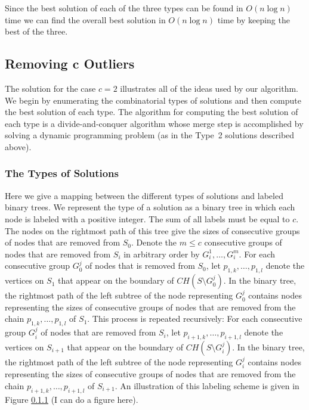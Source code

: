 \documentclass[lotsofwhite]{patmorin}
\begin{document}
Since the best solution of each of the three types can be found in
$O(n\log n)$ time we can find the overall best solution in $O(n\log
n)$ time by keeping the best of the three.

\subsection{Removing $\mathbf{c}$ Outliers}

The solution for the case $c=2$ illustrates all of the ideas used by
our algorithm.  We begin by enumerating the combinatorial types of
solutions and then compute the best solution of each type.  The
algorithm for computing the best solution of each type is a
divide-and-conquer algorithm whose merge step is accomplished by
solving a dynamic programming problem (as in the Type~2 solutions
described above).

\subsubsection{The Types of Solutions}

Here we give a mapping between the different types of solutions and labeled binary trees. We
represent the type of a solution as a binary tree in which each node is labeled with a
positive integer.  The sum of all labels must be equal to $c$.  The nodes on the rightmost
path of this tree give the sizes of consecutive groups of nodes that are removed from $S_0$.
Denote the $m \leq c$ consecutive groups of nodes that are removed from $S_i$ in arbitrary
order by $G_i^1, \dots, G_i^m$. For each consecutive group $G_0^j$ of nodes that is removed
from $S_0$, let $p_{1,k}, \ldots, p_{1,l}$ denote the vertices on $S_1$ that appear on the
boundary of $CH(S \setminus G_0^j)$. In the binary tree, the rightmost path of the left
subtree of the node representing $G_0^j$ contains nodes representing the sizes of consecutive
groups of nodes that are removed from the chain $p_{1,k}, \ldots, p_{1,l}$ of $S_1$. This
process is repeated recursively: For each consecutive group $G_i^j$ of nodes that are removed
from $S_i$, let $p_{i+1,k}, \ldots, p_{i+1,l}$ denote the vertices on $S_{i+1}$ that appear on
the boundary of $CH(S \setminus G_i^j)$. In the binary tree, the rightmost path of the left
subtree of the node representing $G_i^j$ contains nodes representing the sizes of consecutive
groups of nodes that are removed from the chain $p_{i+1,k}, \ldots, p_{i+1,l}$ of $S_{i+1}$.
An illustration of this labeling scheme is given in Figure \ref{} (I can do a figure here).
\end{document}
